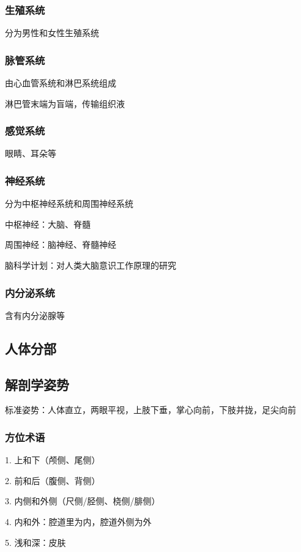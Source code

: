\subsubsection*{生殖系统}%
\label{subsub:生殖系统}
分为男性和女性生殖系统
\subsubsection*{脉管系统}%
\label{subsub:脉管系统}
由心血管系统和淋巴系统组成
\begin{notation}
    淋巴管末端为盲端，传输组织液
\end{notation}
\subsubsection*{感觉系统}%
\label{subsub:感觉系统}
眼睛、耳朵等
\subsubsection*{神经系统}%
\label{subsub:神经系统}
分为中枢神经系统和周围神经系统

中枢神经：大脑、脊髓

周围神经：脑神经、脊髓神经
\begin{notation}
    脑科学计划：对人类大脑意识工作原理的研究
\end{notation}
\subsubsection*{内分泌系统}%
\label{subsub:内分泌系统}
含有内分泌腺等
\subsection{人体分部}%
\label{sub:人体分部}
\subsection{解剖学姿势}%
\label{sub:解剖学姿势}
标准姿势：人体直立，两眼平视，上肢下垂，掌心向前，下肢并拢，足尖向前
\subsubsection{方位术语}%
\label{subsub:方位术语}
1. 上和下（颅侧、尾侧）

2. 前和后（腹侧、背侧）

3. 内侧和外侧（尺侧/胫侧、桡侧/腓侧）

4. 内和外：腔道里为内，腔道外侧为外

5. 浅和深：皮肤

